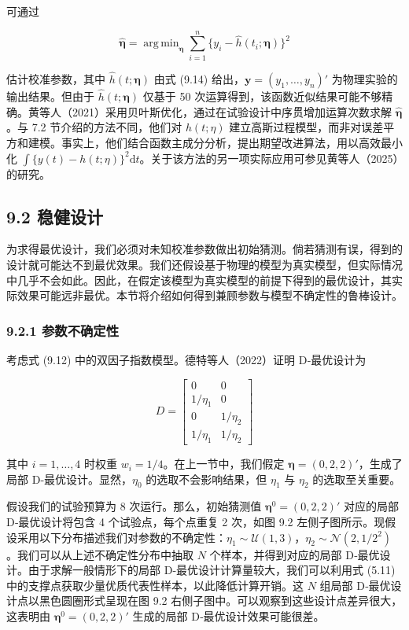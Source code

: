 \documentclass{ctexart}
\DeclareMathOperator*{\argmin}{arg\,min}
\begin{document}
可通过

\begin{equation*}
\widehat{\boldsymbol{\eta}}=\argmin_{\boldsymbol{\eta}}\sum_{i=1}^{n}\{y_i-\widehat{h}(t_i;\boldsymbol{\eta})\}^2
\end{equation*}

估计校准参数，其中 $\widehat{h}(t;\boldsymbol{\eta})$ 由式 (9.14) 给出，$\boldsymbol{y}=(y_1,\dots,y_n)'$ 为物理实验的输出结果。但由于 $\widehat{h}(t;\boldsymbol{\eta})$ 仅基于 50 次运算得到，该函数近似结果可能不够精确。黄等人（2021）采用贝叶斯优化，通过在试验设计中序贯增加运算次数求解 $\widehat{\boldsymbol{\eta}}$。与 7.2 节介绍的方法不同，他们对 $h(t;\eta)$ 建立高斯过程模型，而非对误差平方和建模。事实上，他们结合函数主成分分析，提出期望改进算法，用以高效最小化 $\int\{y(t)-h(t;\eta)\}^2\mathrm{d}t$。关于该方法的另一项实际应用可参见黄等人（2025）的研究。

\subsection*{9.2 稳健设计}

为求得最优设计，我们必须对未知校准参数做出初始猜测。倘若猜测有误，得到的设计就可能达不到最优效果。我们还假设基于物理的模型为真实模型，但实际情况中几乎不会如此。因此，在假定该模型为真实模型的前提下得到的最优设计，其实际效果可能远非最优。本节将介绍如何得到兼顾参数与模型不确定性的鲁棒设计。

\subsubsection*{9.2.1 参数不确定性}

考虑式 (9.12) 中的双因子指数模型。德特等人（2022）证明 D‑最优设计为

\begin{equation*}
D=\begin{bmatrix}
0&0\\1/\eta_1&0\\
0&1/\eta_2\\1/\eta_1&1/\eta_2
\end{bmatrix}
\end{equation*}

其中 $i=1,\dots,4$ 时权重 $w_i=1/4$。在上一节中，我们假定 $\boldsymbol{\eta}=(0,2,2)'$，生成了局部 D‑最优设计。显然，$\eta_0$ 的选取不会影响结果，但 $\eta_1$ 与 $\eta_2$ 的选取至关重要。

假设我们的试验预算为 8 次运行。那么，初始猜测值 $\boldsymbol{\eta}^0=(0,2,2)'$ 对应的局部 D‑最优设计将包含 4 个试验点，每个点重复 2 次，如图 9.2 左侧子图所示。现假设采用以下分布描述我们对参数的不确定性：$\eta_1\sim\mathcal{U}(1,3)$，$\eta_2\sim\mathcal{N}(2,1/2^2)$。我们可以从上述不确定性分布中抽取 $N$ 个样本，并得到对应的局部 D‑最优设计。由于求解一般情形下的局部 D‑最优设计计算量较大，我们可以利用式 (5.11) 中的支撑点获取少量优质代表性样本，以此降低计算开销。这 $N$ 组局部 D‑最优设计点以黑色圆圈形式呈现在图 9.2 右侧子图中。可以观察到这些设计点差异很大，这表明由 $\boldsymbol{\eta}^0=(0,2,2)'$ 生成的局部 D‑最优设计效果可能很差。
\end{document}
